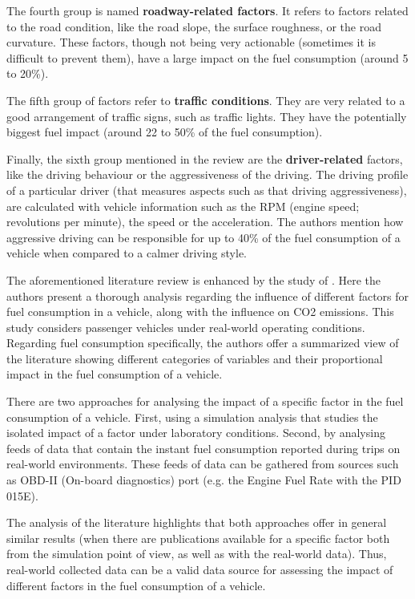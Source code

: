 The fourth group is named \textbf{roadway-related factors}. It refers to factors related to the road condition, like the road slope, the surface roughness, or the road curvature. These factors, though not being very actionable (sometimes it is difficult to prevent them), have a large impact on the fuel consumption (around 5 to 20\%).

The fifth group of factors refer to \textbf{traffic conditions}. They are very related to a good arrangement of traffic signs, such as traffic lights. They have the potentially biggest fuel impact (around 22 to 50\% of the fuel consumption).

Finally, the sixth group mentioned in the review are the \textbf{driver-related} factors, like the driving behaviour or the aggressiveness of the driving. The driving profile of a particular driver (that measures aspects such as that driving aggressiveness), are calculated with vehicle information such as the RPM (engine speed; revolutions per minute), the speed or the acceleration. The authors mention how aggressive driving can be responsible for up to 40\% of the fuel consumption of a vehicle when compared to a calmer driving style. 

The aforementioned literature review is enhanced by the study of \parencite{zacharof2016review}. Here the authors present a thorough analysis regarding the influence of different factors for fuel consumption in a vehicle, along with the influence on CO2 emissions. This study considers passenger vehicles under real-world operating conditions. Regarding fuel consumption specifically, the authors offer a summarized view of the literature showing different categories of variables and their proportional impact in the fuel consumption of a vehicle. 

There are two approaches for analysing the impact of a specific factor in the fuel consumption of a vehicle. First, using a simulation analysis that studies the isolated impact of a factor under laboratory conditions. Second, by analysing feeds of data that contain the instant fuel consumption reported during trips on real-world environments. These feeds of data can be gathered from sources such as OBD-II (On-board diagnostics) port \parencite{ISO14230} (e.g. the Engine Fuel Rate with the PID 015E). 

The analysis of the literature highlights that both approaches offer in general similar results (when there are publications available for a specific factor both from the simulation point of view, as well as with the real-world data). Thus, real-world collected data can be a valid data source for assessing the impact of different factors in the fuel consumption of a vehicle.

